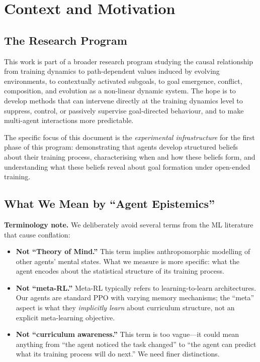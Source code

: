 \documentclass[11pt,a4paper]{article}
\theoremstyle{remark}
\begin{document}
\tableofcontents
\newpage

\section{Context and Motivation}

\subsection{The Research Program}

This work is part of a broader research program studying the causal relationship from training dynamics to path-dependent values induced by evolving environments, to contextually activated subgoals, to goal emergence, conflict, composition, and evolution as a non-linear dynamic system. The hope is to develop methods that can intervene directly at the training dynamics level to suppress, control, or passively supervise goal-directed behaviour, and to make multi-agent interactions more predictable.

The specific focus of this document is the \textit{experimental infrastructure} for the first phase of this program: demonstrating that agents develop structured beliefs about their training process, characterising when and how these beliefs form, and understanding what these beliefs reveal about goal formation under open-ended training.

\subsection{What We Mean by ``Agent Epistemics''}

\textbf{Terminology note.} We deliberately avoid several terms from the ML literature that cause conflation:
\begin{itemize}[nosep]
    \item \textbf{Not ``Theory of Mind.''} This term implies anthropomorphic modelling of other agents' mental states. What we measure is more specific: what the agent encodes about the statistical structure of its training process.
    \item \textbf{Not ``meta-RL.''} Meta-RL typically refers to learning-to-learn architectures. Our agents are standard PPO with varying memory mechanisms; the ``meta'' aspect is what they \textit{implicitly learn} about curriculum structure, not an explicit meta-learning objective.
    \item \textbf{Not ``curriculum awareness.''} This term is too vague---it could mean anything from ``the agent noticed the task changed'' to ``the agent can predict what its training process will do next.'' We need finer distinctions.
\end{itemize}
\end{document}
